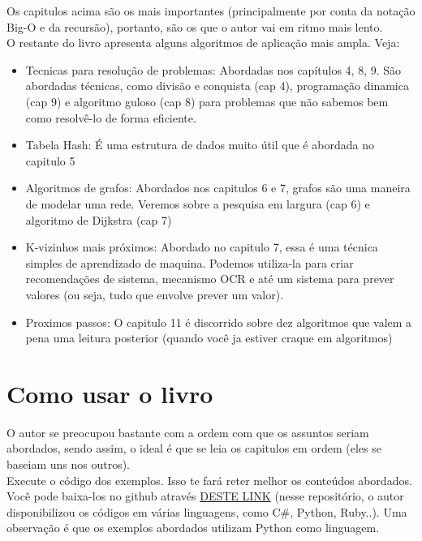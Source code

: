 \documentclass{report}
\begin{document}
	Os capitulos acima são os mais importantes (principalmente por conta da notação Big-O e da recursão), portanto, são os que o autor vai em ritmo mais lento.\\
	
	O restante do livro apresenta alguns algoritmos de aplicação mais ampla. Veja:
	
	\begin{itemize}
		\item Tecnicas para resolução de problemas: Abordadas nos capítulos 4, 8, 9. São abordadas técnicas, como divisão e conquista (cap 4), programação dinamica (cap 9) e algoritmo guloso (cap 8) para problemas que não sabemos bem como resolvê-lo de forma eficiente.
		\item Tabela Hash: É uma estrutura de dados muito útil que é abordada no capitulo 5
		\item Algoritmos de grafos: Abordados nos capitulos 6 e 7, grafos são uma maneira de modelar uma rede. Veremos sobre a pesquisa em largura (cap 6) e algoritmo de Dijkstra (cap 7)
		\item K-vizinhos mais próximos: Abordado no capitulo 7, essa é uma técnica simples de aprendizado de maquina. Podemos utiliza-la para criar recomendações de sistema, mecanismo OCR e até um sistema para prever valores (ou seja, tudo que envolve prever um valor).
		\item Proximos passos: O capitulo 11 é discorrido sobre dez algoritmos que valem a pena uma leitura posterior (quando você ja estiver craque em algoritmos)
	\end{itemize}
	
	\section{Como usar o livro}
	
	O autor se preocupou bastante com a ordem com que os assuntos seriam abordados, sendo assim, o ideal é que se leia os capitulos em ordem (eles se baseiam uns nos outros). \\
	
	Execute o código dos exemplos. Isso te fará reter melhor os conteúdos abordados. Você pode baixa-los no github através \href{github.com/egonschiele/grokking_algorithms}{DESTE LINK} (nesse repositório, o autor disponibilizou os códigos em várias linguagens, como C\#, Python, Ruby..). Uma observação é que os exemplos abordados utilizam Python como linguagem.\\
	
\end{document}
